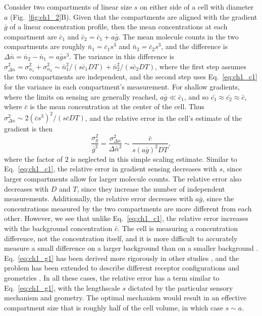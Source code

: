 Consider two compartments of linear size $s$ on either side of a cell with diameter $a$ (Fig.\ \ref{fig:ch1_2}B). Given that the compartments are aligned with the gradient $\bar{g}$ of a linear concentration profile, then the mean concentrations at each compartment are $\bar{c}_1$ and
$\bar{c}_2 = \bar{c}_1 + a\bar{g}$.
The mean molecule counts in the two compartments are roughly $\bar{n}_1 = \bar{c}_1s^3$ and $\bar{n}_2 = \bar{c}_2s^3$, and the difference is $\Delta\bar{n} = \bar{n}_2 - \bar{n}_1 = a\bar{g}s^3$. The variance in this difference is
$\sigma_{\Delta n}^2 = \sigma_{n_1}^2 + \sigma_{n_2}^2 \sim \bar{n}_1^2/(s\bar{c}_1DT) + \bar{n}_2^2/(s\bar{c}_2DT)$,
where the first step assumes the two compartments are independent, and the second step uses Eq.\ \ref{eq:ch1_c1} for the variance in each compartment's measurement. For shallow gradients, where the limits on sensing are generally reached, $a\bar{g} \ll \bar{c}_1$, and so $\bar{c_1} \approx \bar{c_2} \approx \bar{c}$, where $\bar{c}$ is the mean concentration at the center of the cell. Thus
$\sigma_{\Delta n}^2 \sim 2(\bar{c}s^3)^2/(s\bar{c}DT)$,
and the relative error in the cell's estimate of the gradient is then
\begin{equation} \label{eq:ch1_g1}
    \frac{\sigma_g^2}{\bar{g}^2} = \frac{ \sigma_{\Delta n}^2}{ \Delta \bar{n}^2} \sim \frac{\bar{c}}{s(a\bar{g})^2DT},
\end{equation}
where the factor of $2$ is neglected in this simple scaling estimate. Similar to Eq.\ \ref{eq:ch1_c1}, the relative error in gradient sensing decreases with $s$, since larger compartments allow for larger molecule counts. The relative error also decreases with $D$ and $T$, since they increase the number of independent measurements. Additionally, the relative error decreases with $a\bar{g}$, since the concentrations measured by the two compartments are more different from each other. However, we see that unlike Eq.\ \ref{eq:ch1_c1}, the relative error increases with the background concentration $\bar{c}$. The cell is measuring a concentration difference, not the concentration itself, and it is more difficult to accurately measure a small difference on a larger background than on a smaller background \cite{ellison2016cell}.
Eq.\ \ref{eq:ch1_g1} has been derived more rigorously in other studies \cite{endres2009accuracy}, and the problem has been extended to describe different receptor configurations and geometries
\cite{endres2008accuracy,endres2009accuracy,hu2010physical}.
In all these cases, the relative error has a term similar to Eq.\ \ref{eq:ch1_g1}, with the lengthscale $s$ dictated by the particular sensory mechanism and geometry. The optimal mechanism would result in an effective compartment size that is roughly half of the cell volume, in which case $s\sim a$.

